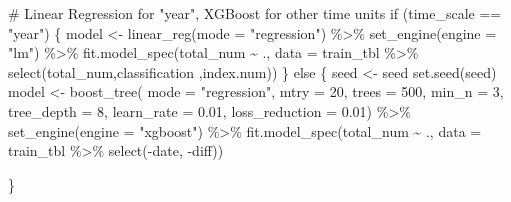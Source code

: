 \documentclass[
  11pt,
]{article}
\newenvironment{Shaded}{\begin{snugshade}}{\end{snugshade}}
\newcommand{\AttributeTok}[1]{\textcolor[rgb]{0.40,0.45,0.13}{#1}}
\newcommand{\CommentTok}[1]{\textcolor[rgb]{0.37,0.37,0.37}{#1}}
\newcommand{\ControlFlowTok}[1]{\textcolor[rgb]{0.00,0.23,0.31}{#1}}
\newcommand{\DecValTok}[1]{\textcolor[rgb]{0.68,0.00,0.00}{#1}}
\newcommand{\FloatTok}[1]{\textcolor[rgb]{0.68,0.00,0.00}{#1}}
\newcommand{\FunctionTok}[1]{\textcolor[rgb]{0.28,0.35,0.67}{#1}}
\newcommand{\NormalTok}[1]{\textcolor[rgb]{0.00,0.23,0.31}{#1}}
\newcommand{\OtherTok}[1]{\textcolor[rgb]{0.00,0.23,0.31}{#1}}
\newcommand{\SpecialCharTok}[1]{\textcolor[rgb]{0.37,0.37,0.37}{#1}}
\newcommand{\StringTok}[1]{\textcolor[rgb]{0.13,0.47,0.30}{#1}}
\begin{document}
\begin{Shaded}
\begin{Highlighting}[]
    \CommentTok{\# Linear Regression for "year", XGBoost for other time units}
    \ControlFlowTok{if}\NormalTok{ (time\_scale }\SpecialCharTok{==} \StringTok{"year"}\NormalTok{) \{}
\NormalTok{      model }\OtherTok{\textless{}{-}} \FunctionTok{linear\_reg}\NormalTok{(}\AttributeTok{mode =} \StringTok{"regression"}\NormalTok{) }\SpecialCharTok{\%\textgreater{}\%}
        \FunctionTok{set\_engine}\NormalTok{(}\AttributeTok{engine =} \StringTok{"lm"}\NormalTok{) }\SpecialCharTok{\%\textgreater{}\%}
        \FunctionTok{fit.model\_spec}\NormalTok{(total\_num }\SpecialCharTok{\textasciitilde{}}\NormalTok{ .,}
                       \AttributeTok{data =}\NormalTok{ train\_tbl }\SpecialCharTok{\%\textgreater{}\%}
                         \FunctionTok{select}\NormalTok{(total\_num,classification ,index.num))}
\NormalTok{    \} }\ControlFlowTok{else}\NormalTok{ \{}
\NormalTok{      seed }\OtherTok{\textless{}{-}}\NormalTok{ seed}
      \FunctionTok{set.seed}\NormalTok{(seed)}
\NormalTok{      model }\OtherTok{\textless{}{-}} \FunctionTok{boost\_tree}\NormalTok{(}
        \AttributeTok{mode =} \StringTok{"regression"}\NormalTok{,}
        \AttributeTok{mtry =} \DecValTok{20}\NormalTok{,}
        \AttributeTok{trees =} \DecValTok{500}\NormalTok{,}
        \AttributeTok{min\_n =} \DecValTok{3}\NormalTok{,}
        \AttributeTok{tree\_depth =} \DecValTok{8}\NormalTok{,}
        \AttributeTok{learn\_rate =} \FloatTok{0.01}\NormalTok{,}
        \AttributeTok{loss\_reduction =} \FloatTok{0.01}\NormalTok{) }\SpecialCharTok{\%\textgreater{}\%}
        \FunctionTok{set\_engine}\NormalTok{(}\AttributeTok{engine =} \StringTok{"xgboost"}\NormalTok{) }\SpecialCharTok{\%\textgreater{}\%}
        \FunctionTok{fit.model\_spec}\NormalTok{(total\_num }\SpecialCharTok{\textasciitilde{}}\NormalTok{ .,}
                       \AttributeTok{data =}\NormalTok{ train\_tbl }\SpecialCharTok{\%\textgreater{}\%} \FunctionTok{select}\NormalTok{(}\SpecialCharTok{{-}}\NormalTok{date,  }\SpecialCharTok{{-}}\NormalTok{diff))}

\NormalTok{    \}}
\end{Highlighting}
\end{Shaded}
\end{document}
